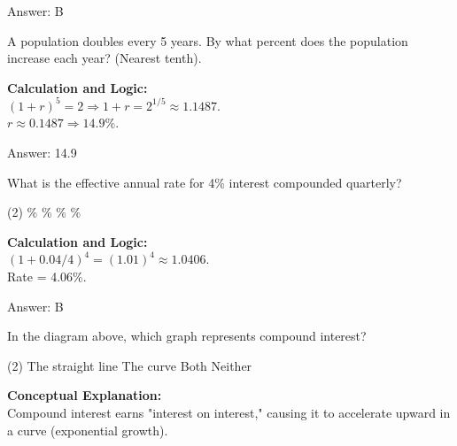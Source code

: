 \documentclass[11pt,paper=a4,answers]{exam}
\begin{document}
\begin{questions}
\begin{solution}
\vspace{30pt}

Answer: \colorbox{yellow!100}{B}
\end{solution}

\vspace{60pt}

\question
A population doubles every 5 years. By what percent does the population increase each year? (Nearest tenth).

\begin{solution}
\textbf{Calculation and Logic:} \\
$(1+r)^5 = 2 \Rightarrow 1+r = 2^{1/5} \approx 1.1487$. \\
$r \approx 0.1487 \Rightarrow 14.9\%$.

\vspace{30pt}

Answer: \colorbox{yellow!100}{14.9}
\end{solution}

\vspace{60pt}

\question
What is the effective annual rate for 4\% interest compounded quarterly?
\begin{tasks}(2)
    \%
    \%
    \%
    \%
\end{tasks}

\begin{solution}
\textbf{Calculation and Logic:} \\
$(1 + 0.04/4)^4 = (1.01)^4 \approx 1.0406$. \\
Rate = 4.06\%.

\vspace{30pt}

Answer: \colorbox{yellow!100}{B}
\end{solution}

\vspace{60pt}

\question

In the diagram above, which graph represents compound interest?
\begin{tasks}(2)
    \task The straight line
    \task The curve
    \task Both
    \task Neither
\end{tasks}

\begin{solution}
\textbf{Conceptual Explanation:} \\
Compound interest earns "interest on interest," causing it to accelerate upward in a curve (exponential growth).


\end{solution}
\end{questions}
\end{document}
